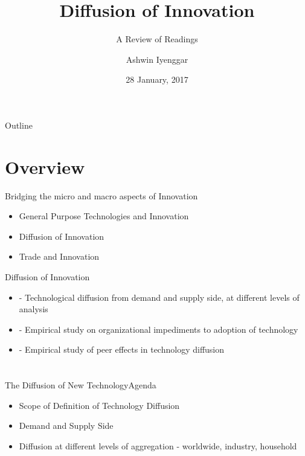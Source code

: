 \documentclass{beamer}
\title{Diffusion of Innovation}
\subtitle{A Review of Readings}
\author{Ashwin Iyenggar}
\institute[Indian Institute of Management Bangalore] 
{
  Corporate Strategy and Policy\\
  Indian Institute of Management Bangalore
}
\date{28 January, 2017}
\begin{document}
\begin{frame}
  \titlepage
\end{frame}

\begin{frame}{Outline}
  \tableofcontents
\end{frame}

\section{Overview}
\begin{frame}{Bridging the micro and macro aspects of Innovation}{}
\begin{itemize}
\item{General Purpose Technologies and Innovation}
\item{Diffusion of Innovation}
\item{Trade and Innovation}
\end{itemize}
\end{frame}

\begin{frame}{Diffusion of Innovation}{}
\begin{itemize}
\item{\cite{Stoneman2010} - Technological diffusion from demand and supply side, at different levels of analysis}
\item{\cite{Atkin2015} - Empirical study on organizational impediments to adoption of technology}
\item{\cite{Bollinger2012} - Empirical study of peer effects in technology diffusion}
\end{itemize}
\end{frame}






\section{\cite{Stoneman2010}}
\begin{frame}{The Diffusion of New Technology}{Agenda}
\begin{itemize}
\item{Scope of Definition of Technology Diffusion}
\item{Demand and Supply Side}
\item{Diffusion at different levels of aggregation - worldwide, industry, household}
\end{itemize}
\end{frame}
\end{document}
